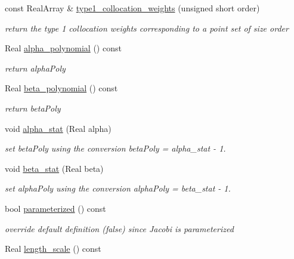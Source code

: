 \begin{DoxyCompactItemize}
const Real\+Array \& \hyperlink{classPecos_1_1JacobiOrthogPolynomial_aa010321cf47465dca5725fa15ba58bf6}{type1\+\_\+collocation\+\_\+weights} (unsigned short order)
\begin{DoxyCompactList}\small\item\em return the type 1 collocation weights corresponding to a point set of size order \end{DoxyCompactList}\item 
Real \hyperlink{classPecos_1_1JacobiOrthogPolynomial_a997bdeddf670667c476513fcacc779ca}{alpha\+\_\+polynomial} () const \label{classPecos_1_1JacobiOrthogPolynomial_a997bdeddf670667c476513fcacc779ca}

\begin{DoxyCompactList}\small\item\em return alpha\+Poly \end{DoxyCompactList}\item 
Real \hyperlink{classPecos_1_1JacobiOrthogPolynomial_a22bfc4209dec76716ef51648e945469a}{beta\+\_\+polynomial} () const \label{classPecos_1_1JacobiOrthogPolynomial_a22bfc4209dec76716ef51648e945469a}

\begin{DoxyCompactList}\small\item\em return beta\+Poly \end{DoxyCompactList}\item 
void \hyperlink{classPecos_1_1JacobiOrthogPolynomial_aeeb4ce11a8d413209be1ec08eced8728}{alpha\+\_\+stat} (Real alpha)\label{classPecos_1_1JacobiOrthogPolynomial_aeeb4ce11a8d413209be1ec08eced8728}

\begin{DoxyCompactList}\small\item\em set beta\+Poly using the conversion beta\+Poly = alpha\+\_\+stat -\/ 1. \end{DoxyCompactList}\item 
void \hyperlink{classPecos_1_1JacobiOrthogPolynomial_a7f9584e538ee1574bd4d8d1afb622ed6}{beta\+\_\+stat} (Real beta)\label{classPecos_1_1JacobiOrthogPolynomial_a7f9584e538ee1574bd4d8d1afb622ed6}

\begin{DoxyCompactList}\small\item\em set alpha\+Poly using the conversion alpha\+Poly = beta\+\_\+stat -\/ 1. \end{DoxyCompactList}\item 
bool \hyperlink{classPecos_1_1JacobiOrthogPolynomial_abc2afafc150f648667a41e0ce656b6da}{parameterized} () const \label{classPecos_1_1JacobiOrthogPolynomial_abc2afafc150f648667a41e0ce656b6da}

\begin{DoxyCompactList}\small\item\em override default definition (false) since Jacobi is parameterized \end{DoxyCompactList}\item 
Real \hyperlink{classPecos_1_1JacobiOrthogPolynomial_a8c1e8d014e82efc5a1c20f973b5bc715}{length\+\_\+scale} () const 
\end{DoxyCompactItemize}
